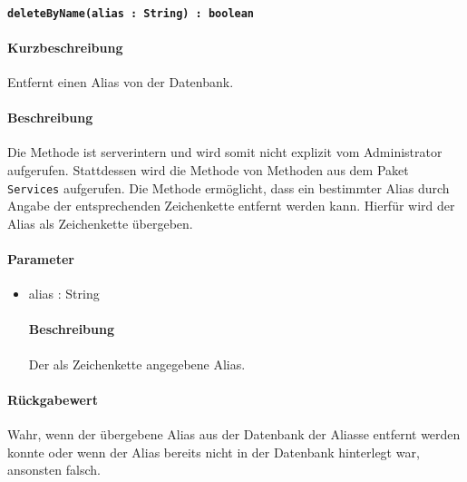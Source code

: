 \paragraph{\texttt{deleteByName(alias : String) : boolean}}%
\paragraph*{Kurzbeschreibung}
Entfernt einen Alias von der Datenbank.
\paragraph*{Beschreibung}
Die Methode ist serverintern und wird somit nicht explizit vom Administrator aufgerufen.
Stattdessen wird die Methode von Methoden aus dem Paket \texttt{Services} aufgerufen.
Die Methode ermöglicht, dass ein bestimmter Alias durch Angabe der entsprechenden Zeichenkette entfernt werden kann.
Hierfür wird der Alias als Zeichenkette übergeben.
\paragraph*{Parameter}
\begin{itemize}
    \item alias : String
    		\paragraph*{Beschreibung}
    		Der als Zeichenkette angegebene Alias.
\end{itemize}
\paragraph*{Rückgabewert}
Wahr, wenn der übergebene Alias aus der Datenbank der Aliasse entfernt werden konnte oder wenn der Alias bereits nicht in der Datenbank hinterlegt war, ansonsten falsch.
